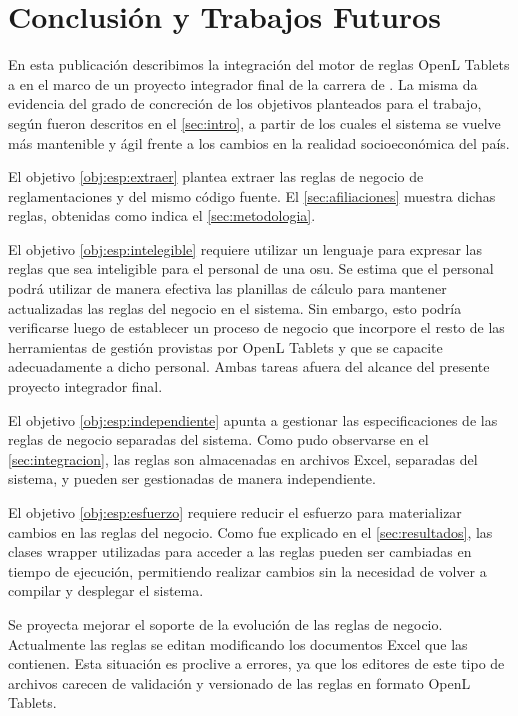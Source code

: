 \section{Conclusión y Trabajos Futuros}\label{sec:conclusiones}

En esta publicación describimos la integración del motor de reglas OpenL Tablets a
{\SIDOSPU} en el marco de un proyecto integrador final de la carrera de {\CARRERA}.
%
La misma da evidencia del grado de concreción de los objetivos planteados para el trabajo, según fueron descritos en el \cref{sec:intro}, a partir de los cuales el sistema se vuelve más mantenible y ágil frente a los cambios en la realidad socioeconómica del país.

El objetivo \ref{obj:esp:extraer} plantea extraer las reglas de negocio de reglamentaciones y del mismo código fuente. 
El \cref{sec:afiliaciones} muestra dichas reglas, obtenidas como indica el \cref{sec:metodologia}. 

El objetivo \ref{obj:esp:intelegible} requiere utilizar un lenguaje para expresar las reglas que sea inteligible para el personal de una \acrshort{osu}.
Se estima que el personal podrá utilizar de manera efectiva las planillas de cálculo para mantener actualizadas las reglas del negocio en el sistema.
Sin embargo, esto podría verificarse luego de establecer un proceso de negocio que incorpore el resto de las herramientas de gestión provistas por OpenL Tablets y que se capacite adecuadamente a dicho personal. 
Ambas tareas afuera del alcance del presente proyecto integrador final.

El objetivo \ref{obj:esp:independiente} apunta a gestionar las especificaciones de las reglas de negocio separadas del sistema. 
Como pudo observarse en el \cref{sec:integracion}, las reglas son almacenadas en archivos Excel, separadas del sistema, y pueden ser gestionadas de manera independiente.

El objetivo \ref{obj:esp:esfuerzo} requiere reducir el esfuerzo para materializar cambios en las reglas del negocio.
Como fue explicado en el \cref{sec:resultados}, las clases wrapper utilizadas para acceder a las reglas pueden ser cambiadas en tiempo de ejecución, permitiendo realizar cambios sin la necesidad de volver a compilar y desplegar el sistema.

Se proyecta mejorar el soporte de la evolución de las reglas de negocio.
%
Actualmente las reglas se editan modificando los documentos Excel que las contienen.
Esta situación es proclive a errores, ya que los editores de este tipo de archivos carecen de validación y versionado de las reglas en formato OpenL Tablets. 

